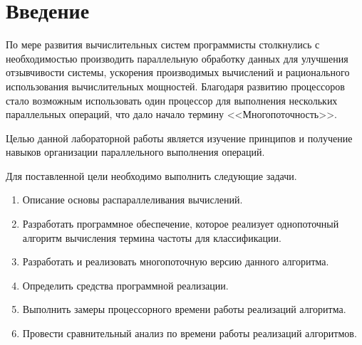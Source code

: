 \chapter*{Введение}

По мере развития вычислительных систем программисты столкнулись с
необходимостью производить параллельную обработку данных для улучшения отзывчивости системы, ускорения производимых вычислений и рационального использования вычислительных мощностей. Благодаря развитию
процессоров стало возможным использовать один процессор для выполнения нескольких параллельных операций, что дало начало термину <<Многопоточность>>.

Целью данной лабораторной работы является изучение принципов и получение навыков организации параллельного выполнения операций.

Для поставленной цели необходимо выполнить следующие задачи.
\begin{enumerate}
	\item Описание основы распараллеливания вычислений.
	\item Разработать программное обеспечение, которое реализует однопоточный алгоритм вычисления термина частоты для классификации.
	\item Разработать и реализовать многопоточную версию данного алгоритма.
	\item Определить средства программной реализации.
	\item Выполнить замеры процессорного времени работы реализаций алгоритма.
	\item Провести сравнительный анализ по времени работы реализаций алгоритмов.
\end{enumerate}